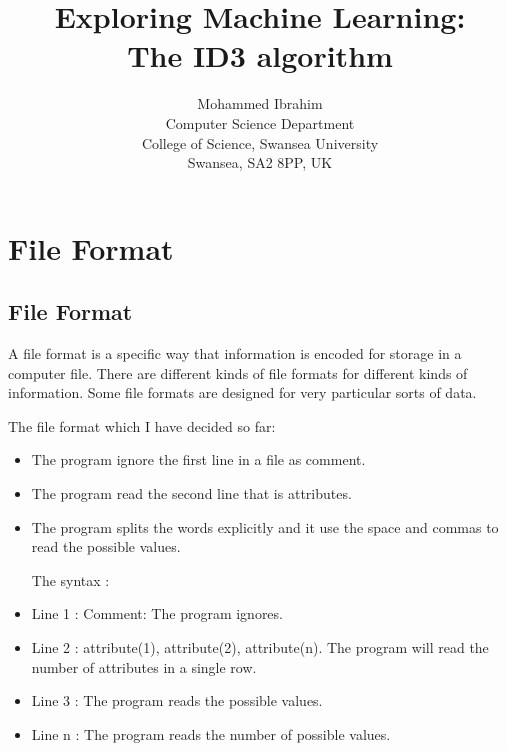\documentclass{report}
\begin{document}
\title{Exploring Machine Learning:\\
  The ID3 algorithm}

\author{Mohammed Ibrahim\\
 Computer Science Department\\
  College of Science, Swansea University\\
  Swansea, SA2 8PP, UK
}

\maketitle

\tableofcontents

\chapter{File Format}
\label{sec:fileformat}

\section{File Format}
\label{sec:file}

A file format is a specific way that information is encoded for storage in a computer file. There are different kinds of file formats for different kinds of information. Some file formats are designed for very particular sorts of data.

The file format which I have decided so far:

\begin{itemize}

\item The program ignore the first line in a file as comment.
\item The program read the second line that is attributes.
\item The program splits the words explicitly and it use the space and commas to read the possible values. 

The syntax : 

\item Line 1 : Comment: The program ignores.
\item Line 2 : attribute(1), attribute(2), attribute(n). The program will read the number of attributes in a single row.
\item Line 3 : The program reads the possible values.
\item Line n : The program reads the number of possible values.

\end{itemize}
\end{document}

